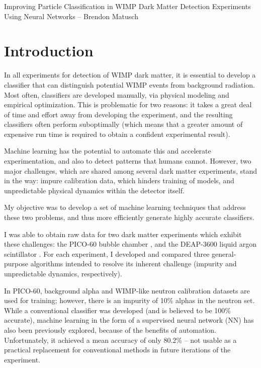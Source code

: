 \documentclass[12pt]{article}
\begin{document}
\begin{center}
    \begin{large}
        Improving Particle Classification in WIMP Dark Matter Detection Experiments Using Neural Networks -- Brendon Matusch
    \end{large}
\end{center}

\section{Introduction}

In all experiments for detection of WIMP dark matter, it is essential to develop a classifier that can distinguish potential WIMP events from background radiation. Most often, classifiers are developed manually, via physical modeling and empirical optimization. This is problematic for two reasons: it takes a great deal of time and effort away from developing the experiment, and the resulting classifiers often perform suboptimally (which means that a greater amount of expensive run time is required to obtain a confident experimental result).

Machine learning has the potential to automate this and accelerate experimentation, and also to detect patterns that humans cannot. However, two major challenges, which are shared among several dark matter experiments, stand in the way: impure calibration data, which hinders training of models, and unpredictable physical dynamics within the detector itself.

My objective was to develop a set of machine learning techniques that address these two problems, and thus more efficiently generate highly accurate classifiers.

I was able to obtain raw data for two dark matter experiments which exhibit these challenges: the PICO-60 bubble chamber \cite{pico}, and the DEAP-3600 liquid argon scintillator \cite{deap}. For each experiment, I developed and compared three general-purpose algorithms intended to resolve its inherent challenge (impurity and unpredictable dynamics, respectively).

In PICO-60, background alpha and WIMP-like neutron calibration datasets are used for training; however, there is an impurity of 10\% alphas in the neutron set. While a conventional classifier was developed (and is believed to be 100\% accurate), machine learning in the form of a supervised neural network (NN) has also been previously explored, because of the benefits of automation. Unfortunately, it achieved a mean accuracy of only 80.2\% -- not usable as a practical replacement for conventional methods in future iterations of the experiment.
\end{document}
